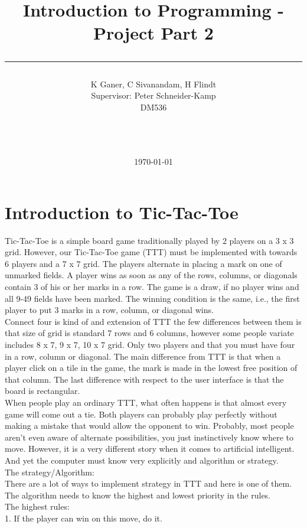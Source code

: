 \documentclass[a4paper,10pt]{article}
\title{Introduction to Programming - Project Part 2 \\\rule{10cm}{0.5mm}}
\author{K Ganer, C Sivanandam, H Flindt 
	\\Supervisor: Peter Schneider-Kamp\\ DM536\\\rule{5.5cm}{0.5mm}\\}
\date{\today}
\begin{document}
	
	\maketitle
	
	\vfill
	
	\tableofcontents
	
	\newpage
	
	\section{Introduction to Tic-Tac-Toe}
Tic-Tac-Toe is a simple board game traditionally played by 2 players on a 3 x 3 grid. However, our Tic-Tac-Toe game (TTT) must be implemented with towards 6 players and a 7 x 7 grid. The players alternate in placing a mark on one of unmarked fields. A player wins as soon as any of the rows, columns, or diagonals contain 3 of his or her marks in a row. The game is a draw, if no player wins and all 9-49 fields have been marked. The winning condition is the same, i.e., the first player to put 3 marks in a row, column, or diagonal wins.\\ 
Connect four is kind of and extension of TTT the few differences between them is that size of grid is standard 7 rows and 6 columns, however some people variate includes 8 x 7, 9 x 7, 10 x 7 grid. Only two players and that you must have four in a row, column or diagonal. The main difference from TTT is that when a player click on a tile in the game, the mark is made in the lowest free position of that column. The last difference with respect to the user interface is that the board is rectangular.\\
When people play an ordinary TTT, what often happens is that almost every game will come out a tie. Both players can probably play perfectly without making a mistake that would allow the opponent to win. Probably, most people aren’t even aware of alternate possibilities, you just instinctively know where to move. However, it is a very different story when it comes to artificial intelligent. And yet the computer must know very explicitly and algorithm or strategy.\\
The strategy/Algorithm:\\
There are a lot of ways to implement strategy in TTT and here is one of them. The algorithm needs to know the highest and lowest priority in the rules.\\ 
The highest rules:\\
1. If the player can win on this move, do it. \\
\end{document}
